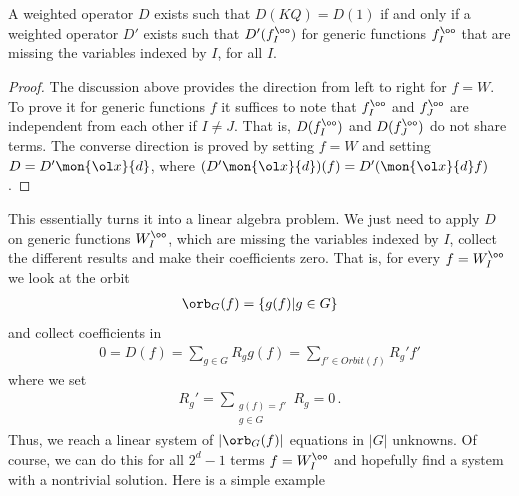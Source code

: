 \begin{lemma}A weighted operator $D$ exists such that $D( KQ) = D(1)$ if and only if a weighted operator $D'$ exists such that $D'(f_I^\oo)$ for generic functions $f_I^\oo$ that are missing the variables indexed by $I$, for all $I$.
\end{lemma}
\begin{proof} The discussion above provides the direction from left to right for $f = W$. To prove it for generic functions $f$ it suffices to note that $f_I^\oo$ and $f_J^\oo$ are independent from each other if $I \neq J$. That is, $D(f_I^\oo)$ and $D(f_J^\oo)$ do not share terms. The converse direction is proved by setting $f = W$ and setting $D = D'\mon{\ol x}{d}$, where $(D'\mon{\ol x}{d} )(f) = D'(\mon{\ol x}{d} f)$.
\end{proof}
This essentially turns it into a linear algebra problem. We just need to apply $D$ on generic functions $W_I^\oo$, which are missing the variables indexed by $I$, collect the different results and make their coefficients zero. That is, for every $f = W_I^\oo$ we look at the orbit
\begin{align}
	\orb_G(f) = \{g(f)| g \in G\}
\end{align}
and collect coefficients in
\begin{align}
	0 = D(f) = \sum_{g\in G}R_g g(f) = \sum_{f' \in Orbit(f)} R_g' f'
\end{align}
where we set
\begin{align}
	R_g' = \sum_{\substack{g(f) = f'\\g\in G}} R_g = 0\,.
\end{align}
Thus, we reach a linear system of $|\orb_G(f)|$ equations in $|G|$ unknowns. Of course, we can do this for all $2^d - 1$ terms $f = W_I^\oo$ and hopefully find a system with a nontrivial solution. Here is a simple example
